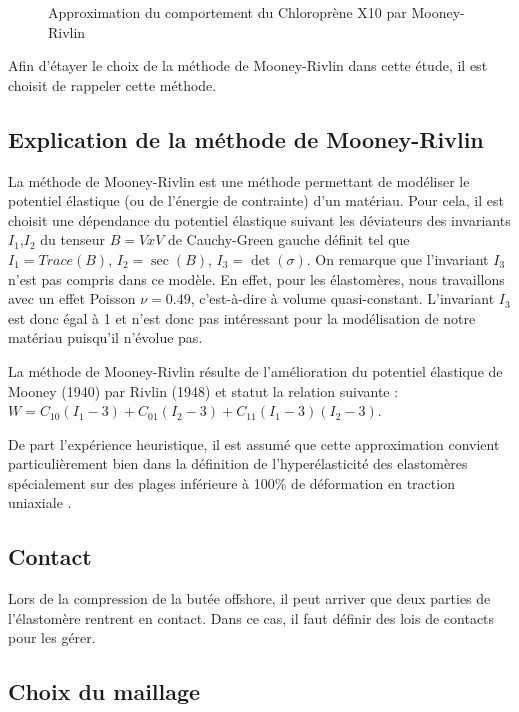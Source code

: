 ﻿ \documentclass{article}
\begin{document}
\begin{figure}
\caption{Approximation du comportement du Chloroprène X10 par Mooney-Rivlin}
\label{fig:plot_donnees_essais}
\end{figure}

Afin d'étayer le choix de la méthode de Mooney-Rivlin dans cette étude, il est choisit de rappeler cette méthode.

\subsection{Explication de la méthode de Mooney-Rivlin}
La méthode de Mooney-Rivlin est une méthode permettant de modéliser le potentiel élastique (ou de l'énergie de contrainte) d'un matériau. Pour cela, il est choisit une dépendance du potentiel élastique suivant les déviateurs des invariants $I_1$,$I_2$ du tenseur $B = V x V$ de Cauchy-Green gauche définit tel que $I_1 = Trace(B)$, $I_2 = \sec(B)$, $I_3=\det(\sigma)$.
On remarque que l'invariant $I_3$ n'est pas compris dans ce modèle. En effet, pour les élastomères, nous travaillons avec un effet Poisson $\nu = 0.49$, c'est-à-dire à volume quasi-constant. L'invariant $I_3$ est donc égal à 1 et n'est donc pas intéressant pour la modélisation de notre matériau puisqu'il n'évolue pas.

La méthode de Mooney-Rivlin résulte de l'amélioration du potentiel élastique de Mooney (1940) par Rivlin (1948) et statut la relation suivante \cite{wiki_MR}: $W = C_10(I_1-3) + C_01(I_2-3) + C_11(I_1-3)(I_2-3)$.

De part l'expérience heuristique, il est assumé que cette approximation convient particulièrement bien dans la définition de l'hyperélasticité des elastomères spécialement sur des plages inférieure à 100\% de déformation en traction uniaxiale \cite{msc}.

\subsection{Contact}
Lors de la compression de la butée offshore, il peut arriver que deux parties de l'élastomère rentrent en contact. Dans ce cas, il faut définir des lois de contacts pour les gérer. 

\subsection{Choix du maillage}
\end{document}

